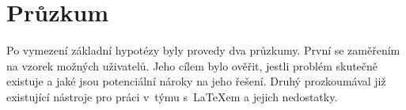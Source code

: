 \chapter{Průzkum}

Po vymezení základní hypotézy byly provedy dva průzkumy. První se zaměřením na vzorek možných uživatelů. Jeho cílem bylo ověřit, jestli problém skutečně existuje a jaké jsou potenciální nároky na jeho řešení. Druhý prozkoumával již existující nástroje pro práci v~týmu s~\LaTeX{em} a jejich nedostatky.






